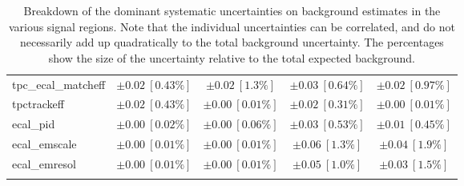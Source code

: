\begin{table}
\begin{center}
\begin{tabular*}{\textwidth}{@{\extracolsep{\fill}}lcccc}
tpc\_ecal\_matcheff         & $\pm 0.02\ [0.43\%] $          & $\pm 0.02\ [1.3\%] $          & $\pm 0.03\ [0.64\%] $          & $\pm 0.02\ [0.97\%] $       \\
tpctrackeff         & $\pm 0.02\ [0.43\%] $          & $\pm 0.00\ [0.01\%] $          & $\pm 0.02\ [0.31\%] $          & $\pm 0.00\ [0.01\%] $       \\
ecal\_pid         & $\pm 0.00\ [0.02\%] $          & $\pm 0.00\ [0.06\%] $          & $\pm 0.03\ [0.53\%] $          & $\pm 0.01\ [0.45\%] $       \\
ecal\_emscale         & $\pm 0.00\ [0.01\%] $          & $\pm 0.00\ [0.01\%] $          & $\pm 0.06\ [1.3\%] $          & $\pm 0.04\ [1.9\%] $       \\
ecal\_emresol         & $\pm 0.00\ [0.01\%] $          & $\pm 0.00\ [0.01\%] $          & $\pm 0.05\ [1.0\%] $          & $\pm 0.03\ [1.5\%] $       \\
\noalign{\smallskip}\hline\noalign{\smallskip}
\end{tabular*}
\end{center}
\caption[Breakdown of uncertainty on background estimates]{
Breakdown of the dominant systematic uncertainties on background estimates in the various signal regions.
Note that the individual uncertainties can be correlated, and do not necessarily add up quadratically to 
the total background uncertainty. The percentages show the size of the uncertainty relative to the total expected background.
\label{table.results.bkgestimate.uncertainties.SR1_FGD1_FHC_SR1_FGD1_RHC_SR1_FGD2_FHC_SR1_FGD2_RHC}}
\end{table}
%
